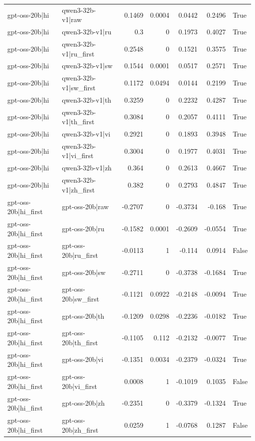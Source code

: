 \begin{table}
\begin{tabular}{l l r r r r l}
gpt-oss-20b|hi & qwen3-32b-v1|raw & 0.1469 & 0.0004 & 0.0442 & 0.2496 & True \\
gpt-oss-20b|hi & qwen3-32b-v1|ru & 0.3 & 0 & 0.1973 & 0.4027 & True \\
gpt-oss-20b|hi & qwen3-32b-v1|ru_first & 0.2548 & 0 & 0.1521 & 0.3575 & True \\
gpt-oss-20b|hi & qwen3-32b-v1|sw & 0.1544 & 0.0001 & 0.0517 & 0.2571 & True \\
gpt-oss-20b|hi & qwen3-32b-v1|sw_first & 0.1172 & 0.0494 & 0.0144 & 0.2199 & True \\
gpt-oss-20b|hi & qwen3-32b-v1|th & 0.3259 & 0 & 0.2232 & 0.4287 & True \\
gpt-oss-20b|hi & qwen3-32b-v1|th_first & 0.3084 & 0 & 0.2057 & 0.4111 & True \\
gpt-oss-20b|hi & qwen3-32b-v1|vi & 0.2921 & 0 & 0.1893 & 0.3948 & True \\
gpt-oss-20b|hi & qwen3-32b-v1|vi_first & 0.3004 & 0 & 0.1977 & 0.4031 & True \\
gpt-oss-20b|hi & qwen3-32b-v1|zh & 0.364 & 0 & 0.2613 & 0.4667 & True \\
gpt-oss-20b|hi & qwen3-32b-v1|zh_first & 0.382 & 0 & 0.2793 & 0.4847 & True \\
gpt-oss-20b|hi_first & gpt-oss-20b|raw & -0.2707 & 0 & -0.3734 & -0.168 & True \\
gpt-oss-20b|hi_first & gpt-oss-20b|ru & -0.1582 & 0.0001 & -0.2609 & -0.0554 & True \\
gpt-oss-20b|hi_first & gpt-oss-20b|ru_first & -0.0113 & 1 & -0.114 & 0.0914 & False \\
gpt-oss-20b|hi_first & gpt-oss-20b|sw & -0.2711 & 0 & -0.3738 & -0.1684 & True \\
gpt-oss-20b|hi_first & gpt-oss-20b|sw_first & -0.1121 & 0.0922 & -0.2148 & -0.0094 & True \\
gpt-oss-20b|hi_first & gpt-oss-20b|th & -0.1209 & 0.0298 & -0.2236 & -0.0182 & True \\
gpt-oss-20b|hi_first & gpt-oss-20b|th_first & -0.1105 & 0.112 & -0.2132 & -0.0077 & True \\
gpt-oss-20b|hi_first & gpt-oss-20b|vi & -0.1351 & 0.0034 & -0.2379 & -0.0324 & True \\
gpt-oss-20b|hi_first & gpt-oss-20b|vi_first & 0.0008 & 1 & -0.1019 & 0.1035 & False \\
gpt-oss-20b|hi_first & gpt-oss-20b|zh & -0.2351 & 0 & -0.3379 & -0.1324 & True \\
gpt-oss-20b|hi_first & gpt-oss-20b|zh_first & 0.0259 & 1 & -0.0768 & 0.1287 & False \\

\end{tabular}
\end{table}
